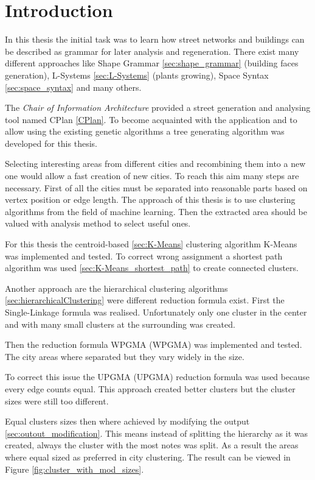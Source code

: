 \chapter{Introduction}
In this thesis the initial task was to learn how street networks and buildings can be described as grammar for later analysis and regeneration. There exist many different approaches like Shape Grammar \ref{sec:shape_grammar} (building faces generation), L-Systems \ref{sec:L-Systems} (plants growing), Space Syntax \ref{sec:space_syntax} and many others. 

The \textit{Chair of Information Architecture} provided a street generation and analysing tool named CPlan \ref{CPlan}. To become acquainted with the application and to allow using the existing genetic algorithms a tree generating algorithm was developed for this thesis. 

Selecting interesting areas from different cities and recombining them into a new one would allow a fast creation of new cities. To reach this aim many steps are necessary. First of all the cities must be separated into reasonable parts based on vertex position or edge length. The approach of this thesis is to use clustering algorithms from the field of machine learning. Then the extracted area should be valued with analysis method to select useful ones.

For this thesis the centroid-based \ref{sec:K-Means} clustering algorithm K-Means was implemented and tested. To correct wrong assignment a shortest path algorithm was used \ref{sec:K-Means_shortest_path} to create connected clusters.

Another approach are the hierarchical clustering algorithms \ref{sec:hierarchicalClustering} were different reduction formula exist. First the Single-Linkage formula was realised. Unfortunately only one cluster in the center and with many small clusters at the surrounding was created.

Then the reduction formula \acrshort{WPGMA} (\acrlong{WPGMA}) was implemented and tested. The city areas where separated but they vary widely in the size.

To correct this issue the \acrshort{UPGMA} (\acrlong{UPGMA}) reduction formula was used because every edge counts equal. This approach created better clusters but the cluster sizes were still too different.

Equal clusters sizes then where achieved by modifying the output \ref{sec:outout_modification}. This means instead of splitting the hierarchy as it was created, always the cluster with the most notes was split. As a result the areas where equal sized as preferred in city clustering. The result can be viewed in Figure  \ref{fig:cluster_with_mod_sizes}.

